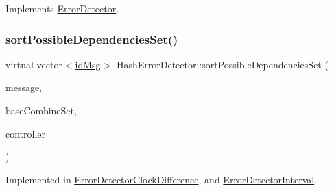 Implements \hyperlink{classErrorDetector_a8cac1f6ac6803da4379df7891789c490}{Error\+Detector}.

\mbox{\label{classHashErrorDetector_ad7419eaab728b7ed3e394d5aee9eda41}} 
\subsubsection{\texorpdfstring{sort\+Possible\+Dependencies\+Set()}{sortPossibleDependenciesSet()}}
{\footnotesize\ttfamily virtual vector$<$\hyperlink{structures_8h_a83a1d9a070efa5341da84cfd8e28d3e5}{id\+Msg}$>$ Hash\+Error\+Detector\+::sort\+Possible\+Dependencies\+Set (\begin{DoxyParamCaption}\item[{const \hyperlink{structures_8h_a7e7bdc1d2fff8a9436f2f352b2711ed6}{message\+Info} \&}]{message,  }\item[{const vector$<$ \hyperlink{structures_8h_a7e7bdc1d2fff8a9436f2f352b2711ed6}{message\+Info} $>$ \&}]{base\+Combine\+Set,  }\item[{\hyperlink{classController}{Controller} $\ast$}]{controller }\end{DoxyParamCaption})\hspace{0.3cm}{\ttfamily [pure virtual]}}



Implemented in \hyperlink{classErrorDetectorClockDifference_a740f6bd74b30e0b194c4b64d79bb8caf}{Error\+Detector\+Clock\+Difference}, and \hyperlink{classErrorDetectorInterval_abe98fbb4f13aeb919d2c2e8755f003ae}{Error\+Detector\+Interval}.

\mbox{\label{classHashErrorDetector_a1c7fe649a34cf7e139ce53a248dce748}} 
